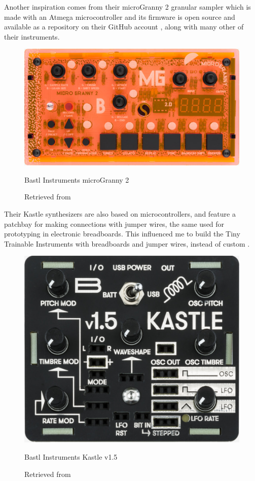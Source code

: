 Another inspiration comes from their microGranny 2 granular sampler which is made with an Atmega microcontroller and its firmware is open source and available as a repository on their GitHub account \cite{github-bastl-instruments}, along with many other of their instruments.

\begin{figure}[ht]
  \centering
  \includegraphics[width=0.75\linewidth,height=0.25\textheight,keepaspectratio]{images/bastl-microgranny-2.jpg}
  \caption{Bastl Instruments microGranny 2}
  \caption*{Retrieved from \cite{website-bastl-instruments-current}}
  \label{fig:bastl-microgranny-2}
\end{figure}

Their Kastle synthesizers are also based on microcontrollers, and feature a patchbay for making connections with jumper wires, the same used for prototyping in electronic breadboards. This influenced me to build the Tiny Trainable Instruments with breadboards and jumper wires, instead of custom .

\begin{figure}[ht]
  \centering
  \includegraphics[width=0.75\linewidth,height=0.25\textheight,keepaspectratio]{images/bastl-kastle-v15.jpg}
  \caption{Bastl Instruments Kastle v1.5}
  \caption*{Retrieved from \cite{website-bastl-instruments-current}}
  \label{fig:bastl-kastle-v15}
\end{figure}


